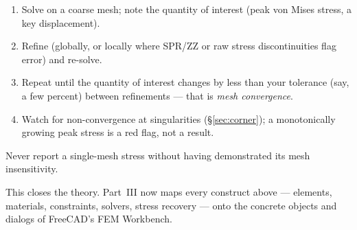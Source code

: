 \begin{fctip}
\begin{enumerate}
  \item Solve on a coarse mesh; note the quantity of interest (peak von
        Mises stress, a key displacement).
  \item Refine (globally, or locally where SPR/ZZ or raw stress
        discontinuities flag error) and re-solve.
  \item Repeat until the quantity of interest changes by less than your
        tolerance (say, a few percent) between refinements --- that is
        \emph{mesh convergence}.
  \item Watch for non-convergence at singularities
        (\S\ref{sec:corner}); a monotonically growing peak stress is a
        red flag, not a result.
\end{enumerate}
Never report a single-mesh stress without having demonstrated its mesh
insensitivity.
\end{fctip}
\label{sec:corner}

This closes the theory. Part~III now maps every construct above ---
elements, materials, constraints, solvers, stress recovery --- onto the
concrete objects and dialogs of FreeCAD's FEM Workbench.
